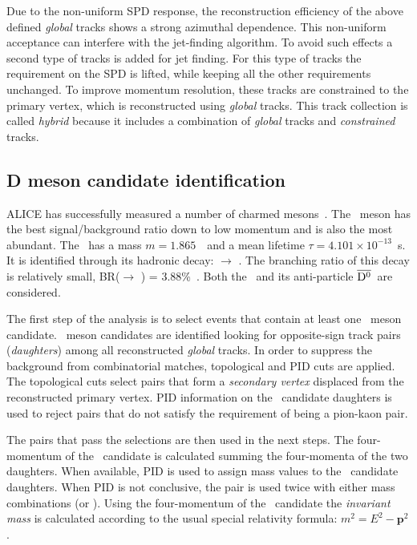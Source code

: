 \documentclass[a4paper]{jpconf}
\begin{document}
Due to the non-uniform SPD response, the reconstruction efficiency of the above defined \emph{global} tracks shows a strong azimuthal dependence.
This non-uniform acceptance can interfere with the jet-finding algorithm. To avoid such effects a second type of tracks is added for jet finding.
For this type of tracks the requirement on the SPD is lifted, while keeping all the other requirements unchanged. To improve momentum resolution,
these tracks are constrained to the primary vertex, which is reconstructed using \emph{global} tracks. This track collection is called \emph{hybrid} because
it includes a combination of \emph{global} tracks and \emph{constrained} tracks.

\subsection{D meson candidate identification}
ALICE has successfully measured a number of charmed mesons~\cite{ALICE:2012d, ALICE:2012e}.
The \Dzero\ meson has the best signal/background ratio down to low momentum and
is also the most abundant. The \Dzero\ has a mass $m=1.865$~\GeVcsq\ and a mean lifetime $\tau=4.101 \times 10^{-13}$~s.
It is identified through its hadronic decay: \Dzero $\rightarrow$ \pip \kam. The branching ratio of this decay
is relatively small, BR(\Dzero $\rightarrow$ \pip \kam) = 3.88\%~\cite{PDG:2014}. Both the \Dzero\ and its
anti-particle $\overline{\mathrm{D^{0}}}$~are considered.

The first step of the analysis is to select events that contain at least one \Dzero\ meson candidate.
\Dzero\ meson candidates are identified looking for opposite-sign track pairs (\emph{daughters}) among all reconstructed \emph{global} tracks.
In order to suppress the background from combinatorial matches, topological and PID cuts are applied.
The topological cuts select pairs that form a \emph{secondary vertex} displaced from the reconstructed
primary vertex. 
PID information on the \Dzero\ candidate daughters is used to reject pairs that do not satisfy the requirement of being a pion-kaon pair.

The pairs that pass the selections are then used in the next steps.
The four-momentum of the \Dzero\ candidate is calculated summing the four-momenta of the two daughters.
When available, PID is used to assign mass values to the \Dzero\ candidate daughters. When PID is not conclusive,
the pair is used twice with either mass combinations (\pip \kam or \pim \kap). Using the four-momentum of the \Dzero\ candidate
the \emph{invariant mass} is calculated according to the usual special relativity formula: $m^2 = E^2 - \bm{p}^2$.
\end{document}
